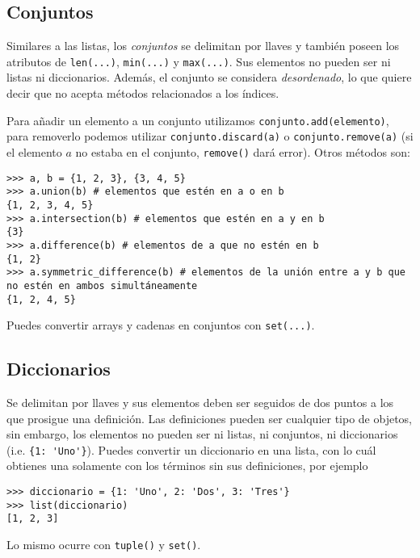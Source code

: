 \documentclass[11pt,twoside]{report}
\begin{document}
\subsection{Conjuntos}
Similares a las listas, los \textit{conjuntos} se delimitan por llaves y también poseen los atributos de \lstinline|len(...)|, \lstinline|min(...)| y \lstinline|max(...)|. Sus elementos no pueden ser ni listas ni diccionarios. Además, el conjunto se considera \textit{desordenado}, lo que quiere decir que no acepta métodos relacionados a los índices.

Para añadir un elemento a un conjunto utilizamos \lstinline|conjunto.add(elemento)|, para removerlo podemos utilizar \lstinline|conjunto.discard(a)| o \lstinline|conjunto.remove(a)| (si el elemento $a$ no estaba en el conjunto, \lstinline|remove()| dará error). Otros métodos son:
\begin{lstlisting}
>>> a, b = {1, 2, 3}, {3, 4, 5}
>>> a.union(b) # elementos que estén en a o en b
{1, 2, 3, 4, 5}
>>> a.intersection(b) # elementos que estén en a y en b
{3}
>>> a.difference(b) # elementos de a que no estén en b
{1, 2}
>>> a.symmetric_difference(b) # elementos de la unión entre a y b que no estén en ambos simultáneamente
{1, 2, 4, 5}
\end{lstlisting}
Puedes convertir arrays y cadenas en conjuntos con \lstinline|set(...)|.

\subsection{Diccionarios}
Se delimitan por llaves y sus elementos deben ser seguidos de dos puntos a los que prosigue una definición. Las definiciones pueden ser cualquier tipo de objetos, sin embargo, los elementos no pueden ser ni listas, ni conjuntos, ni diccionarios (i.e. \lstinline|{1: 'Uno'}|). Puedes convertir un diccionario en una lista, con lo cuál obtienes una solamente con los términos sin sus definiciones, por ejemplo
\begin{lstlisting}
>>> diccionario = {1: 'Uno', 2: 'Dos', 3: 'Tres'}
>>> list(diccionario)
[1, 2, 3]
\end{lstlisting}
Lo mismo ocurre con \lstinline|tuple()| y \lstinline|set()|.
\end{document}
